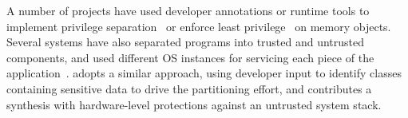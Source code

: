 
A number of projects have used  developer annotations or runtime tools
to implement privilege separation~\citep{brumley2004privtrans} or enforce least privilege~\citep{bittau2008wedge}
on memory objects.
Several systems have also separated programs into trusted and untrusted components, and used different OS instances
for servicing each piece of the application~\citep{singaravelu2006reducing, ta2006splitting, khatiwala2006data}.
\sysname{} adopts a similar approach, using developer input to identify classes containing sensitive data
to drive the partitioning effort, and contributes a synthesis with hardware-level protections against an untrusted system stack.


